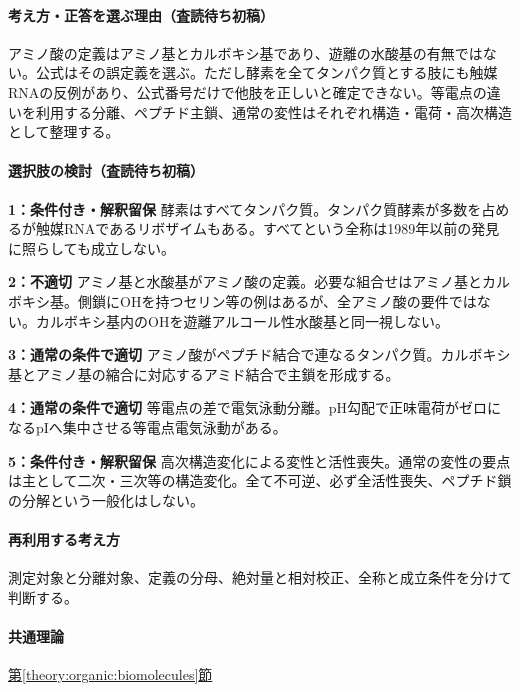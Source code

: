 \paragraph{考え方・正答を選ぶ理由（査読待ち初稿）} アミノ酸の定義はアミノ基とカルボキシ基であり、遊離の水酸基の有無ではない。公式はその誤定義を選ぶ。ただし酵素を全てタンパク質とする肢にも触媒RNAの反例があり、公式番号だけで他肢を正しいと確定できない。等電点の違いを利用する分離、ペプチド主鎖、通常の変性はそれぞれ構造・電荷・高次構造として整理する。

\paragraph{選択肢の検討（査読待ち初稿）}\mbox{}\par

\noindent\textbf{1：条件付き・解釈留保} 酵素はすべてタンパク質。タンパク質酵素が多数を占めるが触媒RNAであるリボザイムもある。すべてという全称は1989年以前の発見に照らしても成立しない。\par

\noindent\textbf{2：不適切} アミノ基と水酸基がアミノ酸の定義。必要な組合せはアミノ基とカルボキシ基。側鎖にOHを持つセリン等の例はあるが、全アミノ酸の要件ではない。カルボキシ基内のOHを遊離アルコール性水酸基と同一視しない。\par

\noindent\textbf{3：通常の条件で適切} アミノ酸がペプチド結合で連なるタンパク質。カルボキシ基とアミノ基の縮合に対応するアミド結合で主鎖を形成する。\par

\noindent\textbf{4：通常の条件で適切} 等電点の差で電気泳動分離。pH勾配で正味電荷がゼロになるpIへ集中させる等電点電気泳動がある。\par

\noindent\textbf{5：条件付き・解釈留保} 高次構造変化による変性と活性喪失。通常の変性の要点は主として二次・三次等の構造変化。全て不可逆、必ず全活性喪失、ペプチド鎖の分解という一般化はしない。\par

\paragraph{再利用する考え方} 測定対象と分離対象、定義の分母、絶対量と相対校正、全称と成立条件を分けて判断する。

\paragraph{共通理論} \hyperref[theory:organic:biomolecules]{第\ref*{theory:organic:biomolecules}節}

